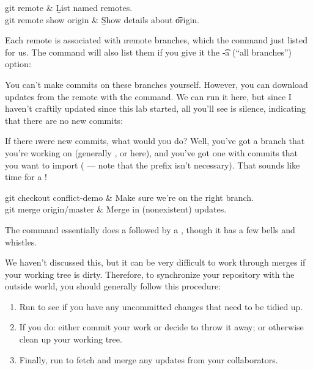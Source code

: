 \documentclass[letterpaper, 12pt, titlepage, twoside]{article}
\begin{document}
\begin{typeme}
git remote & \b{List named remotes.} \\
git remote show origin & \b{Show details about \t{origin}.}
\end{typeme}

Each remote is associated with \i{remote branches}, which the  command just listed for us. The  command will also list
them if you give it the \t{-a} (``all branches'') option:


You can't make commits on these branches yourself. However, you can download
updates from the remote with the  command. We can run it here, but
since I haven't craftily updated  since this lab started, all you'll
see is silence, indicating that there are no new commits:


If there \i{were} new commits, what would you do? Well, you've got a branch
that you're working on (generally , or  here), and
you've got one with commits that you want to import ( ---
note that the  prefix isn't necessary). That sounds like time for
a !

\begin{typeme}
git checkout conflict-demo & Make sure we're on the right branch. \\
git merge origin/master & Merge in (nonexistent) updates.
\end{typeme}

The command  essentially does a  followed by a
, though it has a few bells and whistles.


We haven't discussed this, but it can be very difficult to work through merges
if your working tree is dirty. Therefore, to synchronize your repository with
the outside world, you should generally follow this procedure:

\begin{enumerate}
\item Run  to see if you have any uncommitted changes that need to
  be tidied up.
\item If you do: either commit your work or decide to throw it away; or
  otherwise clean up your working tree.
\item Finally, run  to fetch and merge any updates
  from your collaborators.
\end{enumerate}
\end{document}
